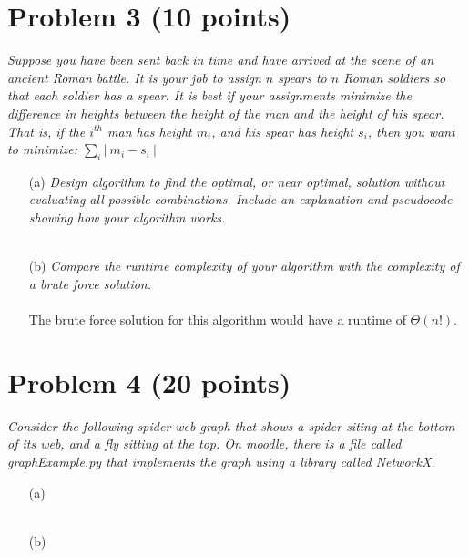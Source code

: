 \documentclass[12pt]{article}
\begin{document}
{\section*{{\selectfont Problem 3 (10 points)}}\vspace{-10mm}
\textsl{Suppose you have been sent back in time and have arrived at the scene of an ancient Roman battle. It is your job to assign $n$ spears to $n$ Roman soldiers so that each soldier has a spear. It is best if your assignments minimize the difference in heights between the height of the man and the height of his spear. That is, if the $i^{th}$ man has height $m_i$, and his spear has height $s_i$, then you want to minimize: $\sum_{i} \left| ~ m_i - s_i ~ \right|$}
\begin{enumerate}
\item[(a)]\textsl{Design algorithm to find the optimal, or near optimal, solution without evaluating all possible combinations. Include an explanation and pseudocode showing how your algorithm works.}\\ \\
\item[(b)]\textsl{Compare the runtime complexity of your algorithm with the complexity of a brute force solution.}\\ \\
The brute force solution for this algorithm would have a runtime of $\Theta(n!)$.
\end{enumerate}

\section*{{\selectfont Problem 4 (20 points)}}\vspace{-10mm}
\textsl{Consider the following spider-web graph that shows a spider siting at the bottom of its web, and a fly sitting at the top. On moodle, there is a file called graphExample.py that implements the graph using a library called NetworkX.}
\begin{enumerate}
\item[(a)]\textsl{}\\ \\
\item[(b)]\textsl{}\\ \\
\end{enumerate}
}
\end{document}
